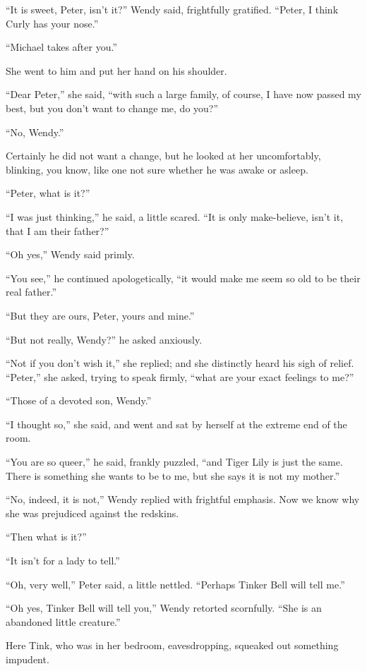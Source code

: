 ``It is sweet, Peter, isn't it?'' Wendy said, frightfully gratified.
``Peter, I think Curly has your nose.''

``Michael takes after you.''

She went to him and put her hand on his shoulder.

``Dear Peter,'' she said, ``with such a large family, of course, I have
now passed my best, but you don't want to change me, do you?''

``No, Wendy.''

Certainly he did not want a change, but he looked at her uncomfortably,
blinking, you know, like one not sure whether he was awake or asleep.

``Peter, what is it?''

``I was just thinking,'' he said, a little scared. ``It is only
make-believe, isn't it, that I am their father?''

``Oh yes,'' Wendy said primly.

``You see,'' he continued apologetically, ``it would make me seem so old
to be their real father.''

``But they are ours, Peter, yours and mine.''

``But not really, Wendy?'' he asked anxiously.

``Not if you don't wish it,'' she replied; and she distinctly heard his
sigh of relief. ``Peter,'' she asked, trying to speak firmly, ``what are
your exact feelings to me?''

``Those of a devoted son, Wendy.''

``I thought so,'' she said, and went and sat by herself at the extreme
end of the room.

``You are so queer,'' he said, frankly puzzled, ``and Tiger Lily is just
the same. There is something she wants to be to me, but she says it is
not my mother.''

``No, indeed, it is not,'' Wendy replied with frightful emphasis. Now we
know why she was prejudiced against the redskins.

``Then what is it?''

``It isn't for a lady to tell.''

``Oh, very well,'' Peter said, a little nettled. ``Perhaps Tinker Bell
will tell me.''

``Oh yes, Tinker Bell will tell you,'' Wendy retorted scornfully. ``She is
an abandoned little creature.''

Here Tink, who was in her bedroom, eavesdropping, squeaked out
something impudent.

